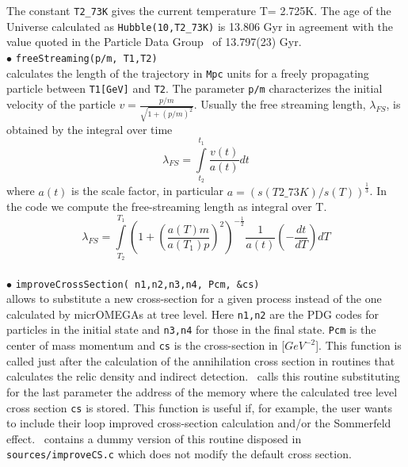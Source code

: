 \documentclass[12pt,a4paper]{article}
\begin{document}
The constant \verb|T2_73K| gives  the  current temperature T= 2.725K. The age of the Universe  calculated as
\verb|Hubble(10,T2_73K)| is 13.806  Gyr in agreement with the value quoted in the Particle Data Group~\cite{Nakamura:2010zzi}
of 13.797(23) Gyr. 
%
\\
\noindent$\bullet$ \verb|freeStreaming(p/m, T1,T2)|\\
calculates  the length of the  trajectory in {\tt Mpc} units  for a freely propagating particle between 
{\tt T1[GeV]} and  {\tt T2}. The parameter {\tt p/m} 
characterizes the initial velocity of the particle $v=\frac{p/m}{\sqrt{ 1+ (p/m)^2}}$.
Usually the free streaming length, $\lambda_{FS}$,  is obtained by the integral over time 
\begin{equation}
 \lambda_{FS}=   \int \limits_{t_2}^{t_1}  \frac{v(t)}{ a(t)}dt 
 \end{equation}
 where $a(t)$ is the scale factor, in particular  $ a = \left( s(T2\_73K)/s(T)\right)^{\frac{1}{3}}$. In the code we compute the free-streaming length
as integral over T.
\begin{equation}
 \lambda_{FS}=  \int
\limits_{T_2}^{T_1}  \left( 1+ \left(\frac{
a(T)m}{ a(T_1)p}\right)^2\right)^{-\frac{1}{2}} \frac{1}{a(t)} \left(-\frac{dt}{dT} \right) dT
\end{equation}  
\\  
%
\noindent$\bullet$ \verb|improveCrossSection( n1,n2,n3,n4, Pcm, &cs)|\\
allows to substitute a new cross-section for a given process instead of the one calculated by
micrOMEGAs at tree level.  Here \verb|n1,n2| are the PDG codes  for  particles in the initial state and
\verb|n3,n4| for those in the final state. \verb|Pcm| is the center of mass momentum and \verb|cs| is the cross-section in
[$GeV^{-2}$].  This function is called just after the calculation
of the annihilation cross section in routines that calculates the  relic density
and indirect detection. \micro\  calls this routine substituting
for the last parameter the address of the memory where the calculated tree level cross section
{\tt cs} is
stored.
 This function is useful if, for example, the user wants to include their loop improved cross-section 
calculation and/or the  Sommerfeld effect.
 \micro\ contains  a dummy version of this routine  disposed in 
\verb|sources/improveCS.c| which does not modify the default  cross section.
\end{document}
